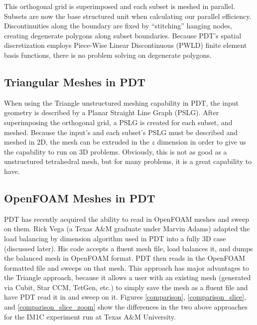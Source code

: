 \documentclass[11pt, letterpaper,titlepage,oneside]{article}
\begin{document}
This orthogonal grid is superimposed and each subset is meshed in parallel.  Subsets are now the base structured unit when calculating our parallel efficiency. Discontinuities along the boundary are fixed by ``stitching'' hanging nodes, creating degenerate polygons along subset boundaries. Because PDT's spatial discretization employs Piece-Wise Linear Discontinuous (PWLD) finite element basis functions, there is no problem solving on degenerate polygons. 

\subsection{Triangular Meshes in PDT}

When using the Triangle unstructured meshing capability in PDT, the input geometry is described by a Planar Straight Line Graph (PSLG). After superimposing the orthogonal grid, a PSLG is created for each subset, and meshed.  Because the input's and each subset's PSLG must be described and meshed in 2D, the mesh can be extruded in the $z$ dimension in order to give us the capability to run on 3D problems. Obviously, this is not as good as a unstructured tetrahedral mesh, but for many problems, it is a great capability to have. 

\subsection{OpenFOAM Meshes in PDT}

PDT has recently acquired the ability to read in OpenFOAM meshes and sweep on them. Rick Vega (a Texas A\&M graduate under Marvin Adams) adapted the load balancing by dimension algorithm used in PDT into a fully 3D case (discussed later). His code accepts a fluent mesh file, load balances it, and dumps the balanced mesh in OpenFOAM format. PDT then reads in the OpenFOAM formatted file and sweeps on that mesh. This approach has major advantages to the Triangle approach, because it allows a user with an existing mesh (generated via Cubit, Star CCM, TetGen, etc.) to simply save the mesh as a fluent file and have PDT read it in and sweep on it. Figures \ref{comparison}, \ref{comparison_slice}, and \ref{comparison_slice_zoom} show the differences in the two above approaches for the IM1C experiment run at Texas A\&M University.
\end{document}
